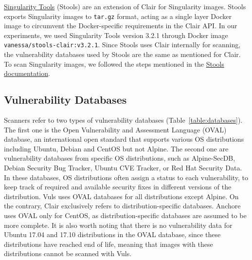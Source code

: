 \documentclass[a4paper,num-refs]{oup-contemporary}
\newcommand{\change}[2]{\color{cyan}Changes: #1\color{black}}
\newcommand{\tristan}[1]{\color{red}From Tristan: #1\color{black}}
\begin{document}
\href{https://github.com/singularityhub/stools}{Singularity Tools} (Stools)
are an extension of Clair for Singularity images. Stools
exports Singularity images to \texttt{tar.gz} format, acting as a single layer Docker image
to circumvent the Docker-specific requirements in the Clair API.
In our experiments, we used Singularity Tools version 3.2.1 through Docker
image
\texttt{vanessa/stools-clair:v3.2.1}.
Since Stools uses Clair internally for scanning, the vulnerability databases used
by Stools are the same as mentioned for Clair.
To scan Singularity images, we followed the steps mentioned in the
\href{https://github.com/singularityhub/stools}{Stools documentation}.

\subsection{Vulnerability Databases}

Scanners refer to two types of
vulnerability databases (Table~\ref{table:databases}). The first one is the Open Vulnerability and
Assessment Language (OVAL) database, an international open standard that
supports various OS distributions including Ubuntu, Debian and CentOS but
not Alpine. The second one are vulnerability databases from specific OS
distributions, such as Alpine-SecDB, Debian Security Bug Tracker, Ubuntu
CVE Tracker, or Red Hat Security Data. In these databases, OS distributions often assign a
status to each vulnerability, to keep track of required and available
security fixes in different versions of the distribution. Vuls uses OVAL
databases for all distributions except Alpine. On the contrary, Clair exclusively refers to
distribution-specific databases. Anchore uses OVAL only for CentOS, as distribution-specific databases
are assumed to be more complete.
It is also worth noting that there is no vulnerability data
for Ubuntu 17.04 and 17.10 distributions in the OVAL database, since these
distributions have reached end of life, meaning that images with these
distributions cannot be scanned with Vuls.
\end{document}
